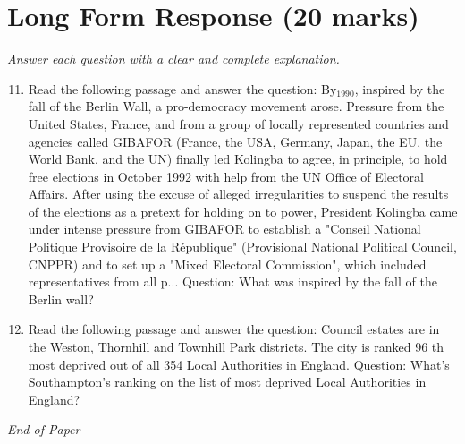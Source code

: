 \documentclass[12pt]{article}
\begin{document}
\section*{Long Form Response (20 marks)}
\textit{Answer each question with a clear and complete explanation.}
\begin{enumerate}[label=\arabic*.]
\setcounter{enumi}{10}
\item Read the following passage and answer the question: By$_{1990}$, inspired by the fall of the Berlin Wall, a pro-democracy movement arose. Pressure from the United States, France, and from a group of locally represented countries and agencies called GIBAFOR (France, the USA, Germany, Japan, the EU, the World Bank, and the UN) finally led Kolingba to agree, in principle, to hold free elections in October 1992 with help from the UN Office of Electoral Affairs. After using the excuse of alleged irregularities to suspend the results of the elections as a pretext for holding on to power, President Kolingba came under intense pressure from GIBAFOR to establish a "Conseil National Politique Provisoire de la République" (Provisional National Political Council, CNPPR) and to set up a "Mixed Electoral Commission", which included representatives from all p... Question: What was inspired by the fall of the Berlin wall?
\item Read the following passage and answer the question: Council estates are in the Weston, Thornhill and Townhill Park districts. The city is ranked 96 th most deprived out of all 354 Local Authorities in England. Question: What's Southampton's ranking on the list of most deprived Local Authorities in England?
\end{enumerate}

\vfill
\noindent\textit{End of Paper}
\end{document}
